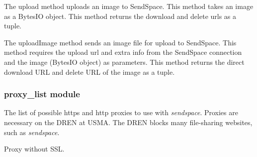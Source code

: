 \documentclass[letterpaper,10pt,english]{sphinxmanual}
\begin{document}
\begin{fulllineitems}

\begin{fulllineitems}
\label{Web_Connection:Web_Connection.api_cons.SendSpace.upload}
The upload method uploads an image to SendSpace.
This method takes an image as a BytesIO object.
This method returns the download and delete urls as a tuple.

\end{fulllineitems}


\begin{fulllineitems}
\label{Web_Connection:Web_Connection.api_cons.SendSpace.uploadImage}
The uploadImage method sends an image file for upload to SendSpace.
This method requires the upload url and extra info from the SendSpace
connection and the image (BytesIO object) as parameters.
This method returns the direct download URL and delete URL of the image
as a tuple.

\end{fulllineitems}


\end{fulllineitems}



\subsubsection{proxy\_list module}
\label{Web_Connection:proxy-list-module}
The list of possible https and http proxies to use with \emph{sendspace}. Proxies are necessary on the DREN at USMA.
The DREN blocks many file-sharing websites, such as \emph{sendspace}.
\label{Web_Connection:module-Web_Connection.proxy_list}

\begin{fulllineitems}
\label{Web_Connection:Web_Connection.proxy_list.proxy}
Proxy without SSL.

\end{fulllineitems}

\end{document}
